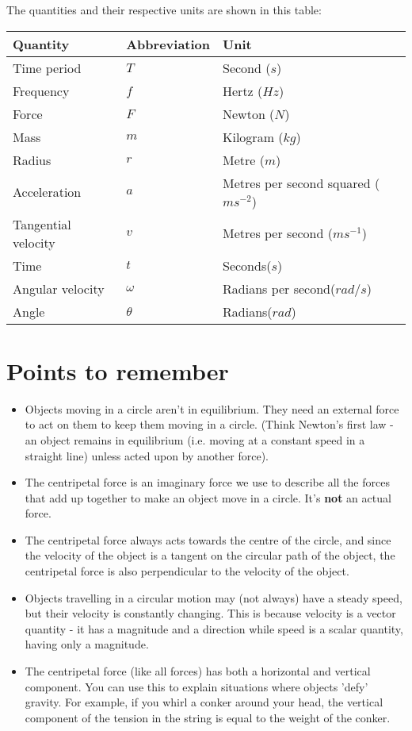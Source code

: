 \documentclass{article}
\begin{document}
The quantities and their respective units are shown in this table:

\begin{center}
	\begin{tabular}{|l|l|l|}
		\hline
			Quantity & Abbreviation & Unit \\ \hline
			Time period & $T$ & Second ($s$) \\ \hline
			Frequency & $f$ & Hertz ($Hz$) \\ \hline
			Force & $F$ & Newton ($N$) \\ \hline
			Mass & $m$ & Kilogram ($kg$) \\ \hline
			Radius & $r$ & Metre ($m$) \\ \hline
			Acceleration & $a$ & Metres per second squared ($ms^{-2}$) \\ \hline
			Tangential velocity & $v$ & Metres per second ($ms^{-1}$) \\ \hline
			Time & $t$ & Seconds($s$) \\ \hline
			Angular velocity & $\omega$ & Radians per second($rad/s$) \\ \hline
			Angle & $\theta$ & Radians($rad$) \\ \hline
	\end{tabular}
\end{center}


\section*{Points to remember}

\begin{itemize}
	\item Objects moving in a circle aren't in equilibrium. They need an external force to act on them to keep them moving in a circle. (Think Newton's first law - an object remains in equilibrium (i.e. moving at a constant speed in a straight line) unless acted upon by another force).
	\item The centripetal force is an imaginary force we use to describe all the forces that add up together to make an object move in a circle. It's \textbf{not} an actual force.
	\item The centripetal force always acts towards the centre of the circle, and since the velocity of the object is a tangent on the circular path of the object, the centripetal force is also perpendicular to the velocity of the object.
	\item Objects travelling in a circular motion may (not always) have a steady speed, but their velocity is constantly changing. This is because velocity is a vector quantity - it has a magnitude and a direction while speed is a scalar quantity, having only a magnitude.
	\item The centripetal force (like all forces) has both a horizontal and vertical component. You can use this to explain situations where objects 'defy' gravity. For example, if you whirl a conker around your head, the vertical component of the tension in the string is equal to the weight of the conker.
\end{itemize}
\end{document}
